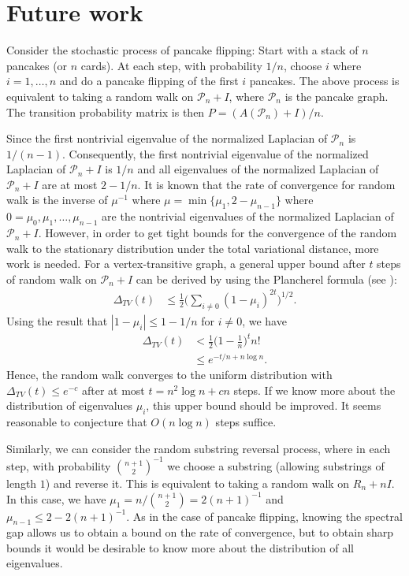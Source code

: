 
\section{Future work}
Consider the stochastic process of pancake flipping:  Start with a stack of $n$ pancakes (or $n$ cards). At each
step, with probability $1/n$,  choose $i$ where $i=1, \ldots, n$ and  do a pancake flipping of the first $i$ pancakes. 
The above process is equivalent to taking a random walk on 
$\mathcal{P}_n + I$, where $\mathcal{P}_n$ is the pancake graph. The transition probability 
matrix is then $P=(A(\mathcal{P}_n)+I)/n$.

Since the first nontrivial eigenvalue of the normalized Laplacian of $\mathcal{P}_n$ is $1/(n-1)$. Consequently,
the first nontrivial eigenvalue of
the normalized Laplacian of $\mathcal{P}_n + I$ is $1/n$ and all eigenvalues of the normalized Laplacian
of $\mathcal{P}_n + I$ are at most $2-1/n$. It is known that the rate of convergence for random walk is the inverse of  $\mu^{-1}$ where $\mu= \min \{\mu_1, 2-\mu_{n-1}\}$ where $0=\mu_0,
\mu_1, \ldots, \mu_{n-1}$ are the nontrivial eigenvalues of the normalized Laplacian of $\mathcal{P}_n + I$. However, in order to get tight bounds for the convergence of the random walk to the stationary distribution under the  total variational distance, more work is needed. For a vertex-transitive graph, a general upper bound after $t$ steps of random walk on 
$\mathcal{P}_n + I$ can be derived by using the Plancherel formula (see \cite{Chung1997}):
\begin{align*}
\Delta_{TV}(t) &\leq \frac 1 2 \Big( \sum_{i \not = 0} (1-\mu_i)^{2t}\Big)^{1/2}.
\end{align*}
Using the result that $|1-\mu_i| \leq 1-1/n$ for $i \not = 0$, we have
\begin{align*}
\Delta_{TV}(t) &< \frac 1 2 \Big(1-\frac 1 n\Big)^t n!\\
&\leq e^{-t/n+n \log n}.
\end{align*}
Hence, the random walk converges to the uniform distribution with $\Delta_{TV}(t) \leq e^{-c}$ after at most $t=n^2 \log n + c n$ steps.
If we know more about the distribution of eigenvalues $\mu_i$, this upper bound should be improved.
It seems reasonable to conjecture that $O(n \log n)$ steps suffice.


Similarly, we can consider the random substring reversal process, where in each
step, with probability $\binom{n+1}{2}^{-1}$ we choose a substring (allowing substrings of length $1$) and reverse it.
This is equivalent to taking a random walk on $R_n+ nI$. 
In this case, we have $\mu_1 = n/ \binom {n+1} 2= 2 (n+1)^{-1}$ and $\mu_{n-1} \leq 2  - 2 (n+1)^{-1}$.   As in the case of 
pancake flipping, knowing the spectral gap allows us to obtain a bound on
the rate of convergence, but to obtain sharp bounds it would be desirable to
know more about the distribution of all eigenvalues.

